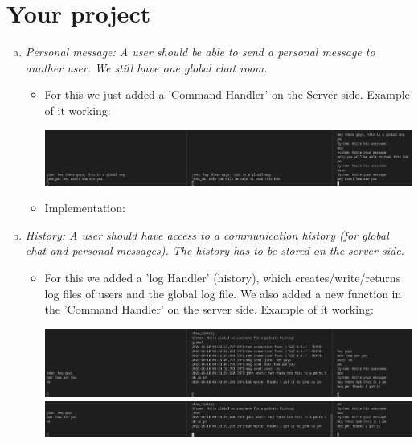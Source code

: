 \section{Your project}
\begin{enumerate}[(a)]
    \item {\itshape Personal message: A user should be able to send a personal message to another user. We still have one global chat room.}
    \begin{itemize}
        \item For this we just added a 'Command Handler' on the Server side. Example of it working:
        
        \includegraphics[width=\textwidth]{src/u7/1.png}
        
        \item Implementation:
        
        

    \end{itemize}
    
    
    \item {\itshape History: A user should have access to a communication history (for global chat and personal messages). The history has to be stored on the server side.}
    \begin{itemize}
        \item For this we added a 'log Handler' (history), which creates/write/returns log files of users and the global log file.
        We also added a new function in the 'Command Handler' on the server side. Example of it working:
        
        \includegraphics[width=\textwidth]{src/u7/2.png}
        \includegraphics[width=\textwidth]{src/u7/3.png}


\end{itemize}
\end{enumerate}
